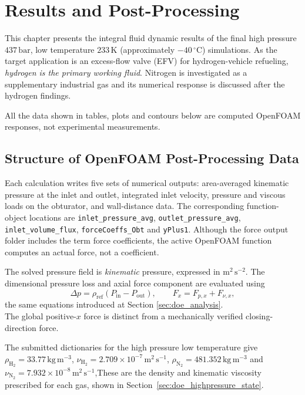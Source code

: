 \chapter{Results and Post-Processing}
\label{ch:results}

This chapter presents the integral fluid dynamic results of the final high pressure $437\,\mathrm{bar}$, low temperature $233\,\mathrm{K}$ (approximately $-40\,^{\circ}\mathrm{C}$) simulations. As the target application is an excess-flow valve (EFV) for hydrogen-vehicle refueling, \emph{hydrogen is the primary working fluid}. Nitrogen is investigated as a supplementary industrial gas and its numerical response is discussed after the hydrogen findings. 

All the data shown in tables, plots and contours below are computed OpenFOAM responses, not experimental measurements.

\section{Structure of OpenFOAM Post-Processing Data}
\label{sec:postprocessing_structure}

Each calculation writes five sets of numerical outputs: area-averaged kinematic pressure at the inlet and outlet, integrated inlet velocity, pressure and viscous loads on the obturator, and wall-distance data. The corresponding function-object locations are \texttt{inlet\_pressure\_avg}, \texttt{outlet\_pressure\_avg}, \texttt{inlet\_volume\_flux}, \texttt{forceCoeffs\_Obt} and \texttt{yPlus1}. Although the force output folder includes the term force coefficients, the active OpenFOAM function computes an actual force, not a coefficient.

The solved pressure field is \emph{kinematic} pressure, expressed in $\mathrm{m^2\,s^{-2}}$. The dimensional pressure loss and axial force component are evaluated using
\begin{equation}
\Delta p=\rho_{\mathrm{ref}}\left(P_{\mathrm{in}}-P_{\mathrm{out}}\right),
\qquad F_x=F_{p,x}+F_{\nu,x},
\label{eq:processed_responses}
\end{equation}
the same equations introduced at Section \ref{sec:doe_analysis}. \\

The global positive-$x$ force is distinct from a mechanically verified closing-direction force.

The submitted dictionaries for the high pressure low temperature give $\rho_{\mathrm{H}_2}=33.77\,\mathrm{kg\,m^{-3}}$, $\nu_{\mathrm{H}_2}=2.709\times10^{-7}\,\mathrm{m^2\,s^{-1}}$, $\rho_{\mathrm{N}_2}=481.352\,\mathrm{kg\,m^{-3}}$ and $\nu_{\mathrm{N}_2}=7.932\times10^{-8}\,\mathrm{m^2\,s^{-1}}$,These are the density and kinematic viscosity prescribed for each gas, shown in Section~\ref{sec:doe_highpressure_state}.

